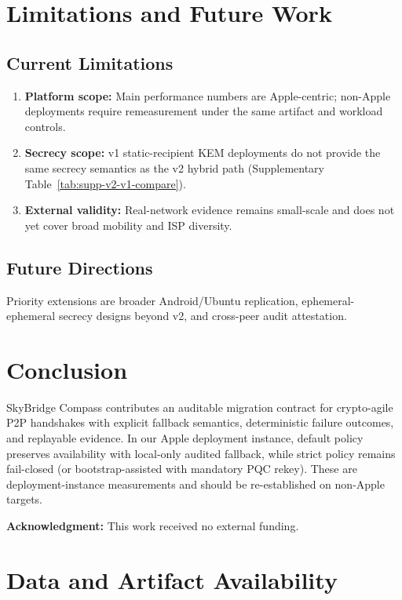 \documentclass[10pt,journal,compsoc]{IEEEtran}
\begin{document}
\section{Limitations and Future Work}\label{sec:limitations}

\subsection{Current Limitations}
\begin{enumerate}
\item \textbf{Platform scope:} Main performance numbers are Apple-centric;
non-Apple deployments require remeasurement under the same artifact and
workload controls.
\item \textbf{Secrecy scope:} v1 static-recipient KEM deployments do not
provide the same secrecy semantics as the v2 hybrid path
(Supplementary Table~\ref{tab:supp-v2-v1-compare}).
\item \textbf{External validity:} Real-network evidence remains small-scale
and does not yet cover broad mobility and ISP diversity.
\end{enumerate}

\subsection{Future Directions}
Priority extensions are broader Android/Ubuntu replication,
ephemeral-ephemeral secrecy designs beyond v2, and cross-peer audit
attestation.



\section{Conclusion}\label{sec:conclusion}
SkyBridge Compass contributes an auditable migration contract for
crypto-agile P2P handshakes with explicit fallback semantics,
deterministic failure outcomes, and replayable evidence. In our Apple
deployment instance, default policy preserves availability with local-only
audited fallback, while strict policy remains fail-closed (or
bootstrap-assisted with mandatory PQC rekey). These are
deployment-instance measurements and should be re-established on
non-Apple targets.







\noindent\textbf{Acknowledgment:} This work received no external funding.

\section*{Data and Artifact Availability}
\end{document}
